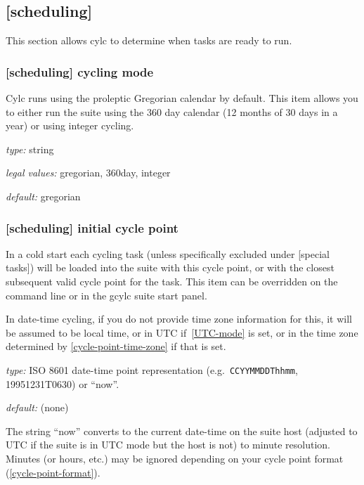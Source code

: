 \subsection{[scheduling]}

This section allows cylc to determine when tasks are ready to run.

\subsubsection[cycling]{ [scheduling] \textrightarrow cycling mode }
\label{cycling-mode}

Cylc runs using the proleptic Gregorian calendar by default. This item allows
you to either run the suite using the 360 day calendar (12 months of 30 days
in a year) or using integer cycling.

\begin{myitemize}
    \item {\em type:} string
    \item {\em legal values:} gregorian, 360day, integer
    \item {\em default:} gregorian

\end{myitemize}

\subsubsection[initial cycle point]{[scheduling] \textrightarrow initial cycle point}
\label{initial cycle point}

In a cold start each cycling task (unless specifically excluded under
[special tasks]) will be loaded into the suite with this cycle point,
or with the closest subsequent valid cycle point for the task.  This item can
be overridden on the command line or in the gcylc suite start panel.

In date-time cycling, if you do not provide time zone information for this,
it will be assumed to be local time, or in UTC if~\ref{UTC-mode} is set, or in
the time zone determined by \ref{cycle-point-time-zone} if that is set.

\begin{myitemize}
    \item {\em type:} ISO 8601 date-time point representation (e.g.\ 
 \lstinline=CCYYMMDDThhmm=, 19951231T0630) or ``now''.
    \item {\em default:} (none)
\end{myitemize}

The string ``now'' converts to the current date-time on the suite host (adjusted
to UTC if the suite is in UTC mode but the host is not) to minute resolution.
Minutes (or hours, etc.) may be ignored depending on your cycle point format
(\ref{cycle-point-format}).

